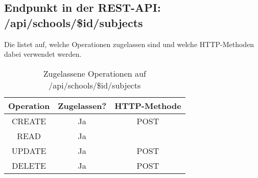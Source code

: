 \subsection{Endpunkt in der REST-API: /api/schools/\$id/subjects}
Die  listet auf, welche Operationen zugelassen sind und welche HTTP-Methoden dabei verwendet werden. 

\begin{table}[!htbp]
	\begin{tabular}{|c|c|c|}
		\hline
			\textbf{Operation} & \textbf{Zugelassen?} & \textbf{HTTP-Methode} \\ \hline
			CREATE & Ja & POST \\ \hline 
			READ & Ja &  \\ \hline
			UPDATE & Ja & POST \\ \hline 
			DELETE & Ja & POST \\ \hline
	\end{tabular}

		\caption{Zugelassene Operationen auf /api/schools/\$id/subjects}
		\label{tab:end:rest:api:schools:id:subjects:meth}
\end{table}

